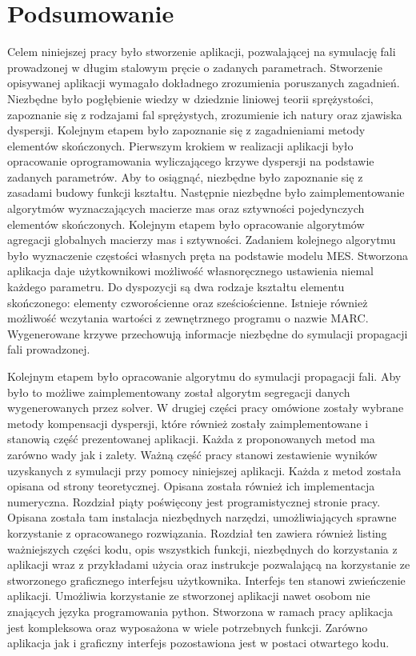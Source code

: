 \chapter{Podsumowanie}
\label{cha:podsumowanie}

Celem niniejszej pracy było stworzenie aplikacji, pozwalającej na symulację fali prowadzonej w długim stalowym pręcie o zadanych parametrach. Stworzenie opisywanej aplikacji wymagało dokładnego zrozumienia poruszanych zagadnień. Niezbędne było pogłębienie wiedzy w dziedznie liniowej teorii sprężystości, zapoznanie się z rodzajami fal sprężystych, zrozumienie ich natury oraz zjawiska dyspersji. Kolejnym etapem było zapoznanie się z zagadnieniami metody elementów skończonych. Pierwszym krokiem w realizacji aplikacji było opracowanie oprogramowania wyliczającego krzywe dyspersji na podstawie zadanych parametrów. Aby to osiągnąć, niezbędne było zapoznanie się z zasadami budowy funkcji kształtu. Następnie niezbędne było zaimplementowanie algorytmów wyznaczających macierze mas oraz sztywności pojedynczych elementów skończonych. Kolejnym etapem było opracowanie algorytmów agregacji globalnych macierzy mas i sztywności. Zadaniem kolejnego algorytmu było wyznaczenie częstości własnych pręta na podstawie modelu MES. Stworzona aplikacja daje użytkownikowi możliwość własnoręcznego ustawienia niemal każdego parametru. Do dyspozycji są dwa rodzaje kształtu elementu skończonego: elementy czworościenne oraz sześciościenne. Istnieje również możliwość wczytania wartości z zewnętrznego programu o nazwie MARC. Wygenerowane krzywe przechowują informacje niezbędne do symulacji propagacji fali prowadzonej. 

Kolejnym etapem było opracowanie algorytmu do symulacji propagacji fali. Aby było to możliwe zaimplementowany został algorytm segregacji danych wygenerowanych przez solver. W drugiej części pracy omówione zostały wybrane metody kompensacji dyspersji, które również zostały zaimplementowane i stanowią część prezentowanej aplikacji. Każda z proponowanych metod ma zarówno wady jak i zalety. Ważną część pracy stanowi zestawienie wyników uzyskanych z symulacji przy pomocy niniejszej aplikacji. Każda z metod została opisana od strony teoretycznej. Opisana została również ich implementacja numeryczna. Rozdział piąty poświęcony jest programistycznej stronie pracy. Opisana została tam instalacja niezbędnych narzędzi, umożliwiających sprawne korzystanie z opracowanego rozwiązania. Rozdział ten zawiera również listing ważniejszych części kodu, opis wszystkich funkcji, niezbędnych do korzystania z aplikacji wraz z przykładami użycia oraz instrukcje pozwalającą na korzystanie ze stworzonego graficznego interfejsu użytkownika. Interfejs ten stanowi zwieńczenie aplikacji. Umożliwia korzystanie ze stworzonej aplikacji nawet osobom nie znających języka programowania python. Stworzona w ramach pracy aplikacja jest kompleksowa oraz wyposażona w wiele potrzebnych funkcji. Zarówno aplikacja jak i graficzny interfejs pozostawiona jest w postaci otwartego kodu. 

